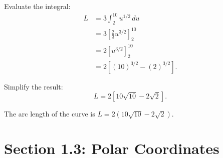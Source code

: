 \documentclass{article}
\begin{document}
\begin{notebox}
    \begin{solutionbox}
        Evaluate the integral:
        \begin{equation*}
            \begin{aligned}
                L &= 3 \int_{2}^{10} u^{1/2} \, du \\
                &= 3 \left[\frac{2}{3} u^{3/2} \right]_{2}^{10} \\
                &= 2 \left[u^{3/2}\right]_{2}^{10} \\
                &= 2 \left[(10)^{3/2} - (2)^{3/2}\right].
            \end{aligned}
        \end{equation*}
    
        Simplify the result:
        \[
            L = 2 \left[10\sqrt{10} - 2\sqrt{2}\right].
        \]
    
        \begin{answerbox}
            The arc length of the curve is \( L = 2 \left(10\sqrt{10} - 2\sqrt{2}\right) \).
        \end{answerbox}
    \end{solutionbox}
\end{notebox}

\section*{Section 1.3: Polar Coordinates}
\end{document}
